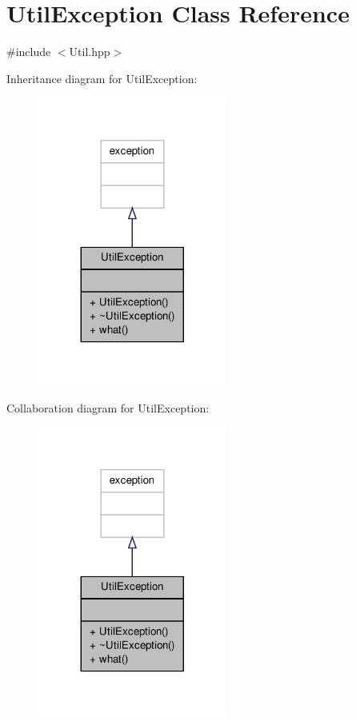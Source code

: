 \hypertarget{class_util_exception}{\section{Util\-Exception Class Reference}
\label{class_util_exception}
}


{\ttfamily \#include $<$Util.\-hpp$>$}



Inheritance diagram for Util\-Exception\-:
\nopagebreak
\begin{figure}[H]
\begin{center}
\leavevmode
\includegraphics[width=176pt]{class_util_exception__inherit__graph}
\end{center}
\end{figure}


Collaboration diagram for Util\-Exception\-:
\nopagebreak
\begin{figure}[H]
\begin{center}
\leavevmode
\includegraphics[width=176pt]{class_util_exception__coll__graph}
\end{center}
\end{figure}
